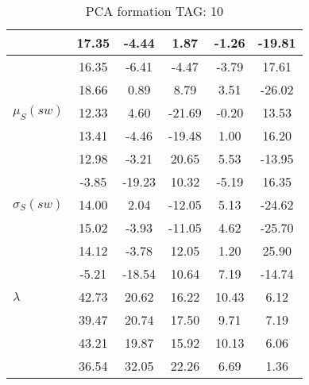 \begin{table}[h!]
\begin{center}
\begin{tabular}{| l | c | c | c | c | c |}
 & 17.35  & -4.44  & 1.87  & -1.26  & -19.81 \\\hline
 & 16.35  & -6.41  & -4.47  & -3.79  & 17.61 \\\hline
 & 18.66  & 0.89  & 8.79  & 3.51  & -26.02 \\\hline
$\mu_S(sw)$ & 12.33  & 4.60  & -21.69  & -0.20  & 13.53 \\\hline
 & 13.41  & -4.46  & -19.48  & 1.00  & 16.20 \\\hline
 & 12.98  & -3.21  & 20.65  & 5.53  & -13.95 \\\hline
 & -3.85  & -19.23  & 10.32  & -5.19  & 16.35 \\\hline
$\sigma_S(sw)$ & 14.00  & 2.04  & -12.05  & 5.13  & -24.62 \\\hline
 & 15.02  & -3.93  & -11.05  & 4.62  & -25.70 \\\hline
 & 14.12  & -3.78  & 12.05  & 1.20  & 25.90 \\\hline
 & -5.21  & -18.54  & 10.64  & 7.19  & -14.74 \\\hline
$\lambda$ & 42.73  & 20.62  & 16.22  & 10.43  & 6.12 \\\hline
 & 39.47  & 20.74  & 17.50  & 9.71  & 7.19 \\\hline
 & 43.21  & 19.87  & 15.92  & 10.13  & 6.06 \\\hline
 & 36.54  & 32.05  & 22.26  & 6.69  & 1.36 \\\hline
\end{tabular}
\caption{PCA formation TAG: 10}
\end{center}
\end{table}